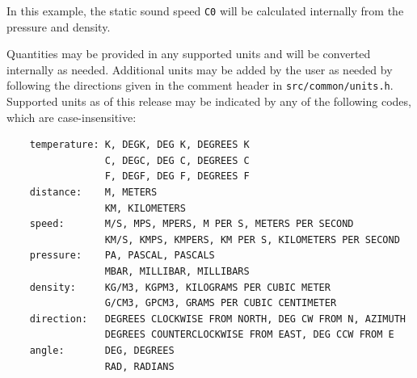 \noindent In this example, the static sound speed \verb"C0" will be calculated internally from the pressure and density.

Quantities may be provided in any supported units and will be converted internally as needed.  Additional units may be added by the user as needed by following the directions given in the comment header in \verb"src/common/units.h".  Supported units as of this release may be indicated by any of the following codes, which are case-insensitive:

\begin{minipage}{\linewidth}
\begin{verbatim}
    temperature: K, DEGK, DEG K, DEGREES K
                 C, DEGC, DEG C, DEGREES C
                 F, DEGF, DEG F, DEGREES F
    distance:    M, METERS
                 KM, KILOMETERS
    speed:       M/S, MPS, MPERS, M PER S, METERS PER SECOND
                 KM/S, KMPS, KMPERS, KM PER S, KILOMETERS PER SECOND
    pressure:    PA, PASCAL, PASCALS
                 MBAR, MILLIBAR, MILLIBARS
    density:     KG/M3, KGPM3, KILOGRAMS PER CUBIC METER
                 G/CM3, GPCM3, GRAMS PER CUBIC CENTIMETER
    direction:   DEGREES CLOCKWISE FROM NORTH, DEG CW FROM N, AZIMUTH
                 DEGREES COUNTERCLOCKWISE FROM EAST, DEG CCW FROM E
    angle:       DEG, DEGREES
                 RAD, RADIANS
\end{verbatim}
\end{minipage}

